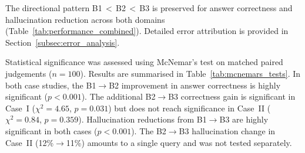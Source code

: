 \documentclass[largeformat]{interact}
\begin{document}




The directional pattern B1\,$<$\,B2\,$<$\,B3 is preserved for answer correctness and hallucination reduction across both domains (Table~\ref{tab:performance_combined}). Detailed error attribution is provided in Section~\ref{subsec:error_analysis}.
 
Statistical significance was assessed using McNemar's test on matched paired judgements ($n = 100$). Results are summarised in Table~\ref{tab:mcnemars_tests}. In both case studies, the B1$\rightarrow$B2 improvement in answer correctness is highly significant ($p < 0.001$). The additional B2$\rightarrow$B3 correctness gain is significant in Case~I ($\chi^2 = 4.65$, $p = 0.031$) but does not reach significance in Case~II ($\chi^2 = 0.84$, $p = 0.359$). Hallucination reductions from B1$\rightarrow$B3 are highly significant in both cases ($p < 0.001$). The B2$\rightarrow$B3 hallucination change in Case~II (12\%$\rightarrow$11\%) amounts to a single query and was not tested separately.
\end{document}
